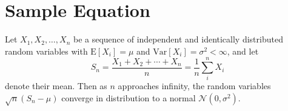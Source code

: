 \documentclass[9pt,twocolumn,twoside]{gsajnl}
\begin{document}
\section*{Sample Equation}

Let $X_1, X_2, \ldots, X_n$ be a sequence of independent and identically distributed random variables with $\text{E}[X_i] = \mu$ and $\text{Var}[X_i] = \sigma^2 < \infty$, and let
\begin{equation}
S_n = \frac{X_1 + X_2 + \cdots + X_n}{n}
      = \frac{1}{n}\sum_{i}^{n} X_i
\label{eq:refname1}
\end{equation}
denote their mean. Then as $n$ approaches infinity, the random variables $\sqrt{n}(S_n - \mu)$ converge in distribution to a normal $\mathcal{N}(0, \sigma^2)$.


\end{document}
